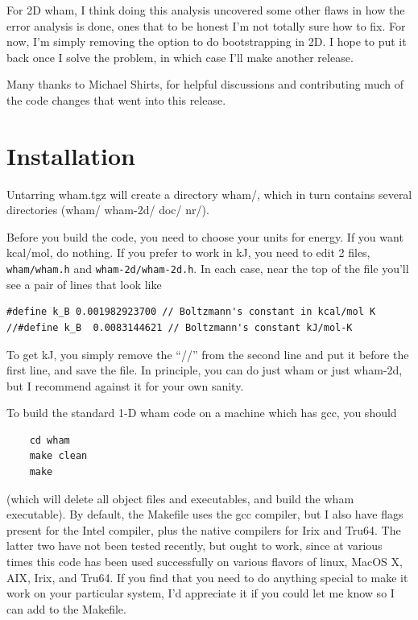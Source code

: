 \documentclass[12pt]{article}
\begin{document}
For 2D wham, I think doing this analysis uncovered some other flaws in how the
error analysis is done, ones that to be honest I'm not totally sure how to
fix.  For now, I'm simply removing the option to do bootstrapping in 2D.  I
hope to put it back once I solve the problem, in which case I'll make another
release.

Many thanks to Michael Shirts, for helpful discussions and contributing much
of the code changes that went into this release.

\section{Installation}

Untarring wham.tgz will create a directory wham/, which in turn contains
several directories (wham/ wham-2d/ doc/ nr/).   

Before you build the code, you need to choose your units for energy.  If you
want kcal/mol, do nothing.  If you prefer to work in kJ, you need to edit
2 files, {\tt wham/wham.h} and {\tt wham-2d/wham-2d.h}.  In each case, near the
top of the file you'll see a pair of lines that look like 

\begin{verbatim}
#define k_B 0.001982923700 // Boltzmann's constant in kcal/mol K
//#define k_B  0.0083144621 // Boltzmann's constant kJ/mol-K
\end{verbatim}

To get kJ, you simply remove the ``//'' from the second line and put it
before the first line, and save the file.  In principle, you can do just wham
or just wham-2d, but I recommend against it for your own sanity.  

To build the standard 1-D wham code on a machine which has gcc, you should

\begin{verbatim}
    cd wham
    make clean
    make
\end{verbatim}

(which will delete all object files and executables, and build the wham
executable).  By default, the Makefile uses the gcc compiler, but I also have
flags present for the Intel compiler, plus the native compilers for Irix and
Tru64.  The latter two have not been tested recently, but ought to work,
since at various times this code has been used successfully on various
flavors of linux, MacOS X, AIX, Irix, and Tru64.  If you find that you need
to do anything special to make it work on your particular system, I'd
appreciate it if you could let me know so I can add to the Makefile.
\end{document}
